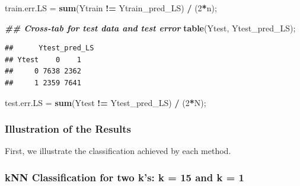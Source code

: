 \documentclass[
]{book}
\newenvironment{Shaded}{\begin{snugshade}}{\end{snugshade}}
\newcommand{\DecValTok}[1]{\textcolor[rgb]{0.00,0.00,0.81}{#1}}
\newcommand{\DocumentationTok}[1]{\textcolor[rgb]{0.56,0.35,0.01}{\textbf{\textit{#1}}}}
\newcommand{\FunctionTok}[1]{\textcolor[rgb]{0.13,0.29,0.53}{\textbf{#1}}}
\newcommand{\NormalTok}[1]{#1}
\newcommand{\OtherTok}[1]{\textcolor[rgb]{0.56,0.35,0.01}{#1}}
\newcommand{\SpecialCharTok}[1]{\textcolor[rgb]{0.81,0.36,0.00}{\textbf{#1}}}
\begin{document}
\begin{Shaded}
\begin{Highlighting}[]
\NormalTok{train.err.LS }\OtherTok{=} \FunctionTok{sum}\NormalTok{(Ytrain }\SpecialCharTok{!=}\NormalTok{  Ytrain\_pred\_LS) }\SpecialCharTok{/}\NormalTok{ (}\DecValTok{2}\SpecialCharTok{*}\NormalTok{n);  }

\DocumentationTok{\#\# Cross{-}tab for test data and test error}
\FunctionTok{table}\NormalTok{(Ytest, Ytest\_pred\_LS);     }
\end{Highlighting}
\end{Shaded}

\begin{verbatim}
##      Ytest_pred_LS
## Ytest    0    1
##     0 7638 2362
##     1 2359 7641
\end{verbatim}

\begin{Shaded}
\begin{Highlighting}[]
\NormalTok{test.err.LS }\OtherTok{=} \FunctionTok{sum}\NormalTok{(Ytest }\SpecialCharTok{!=}\NormalTok{  Ytest\_pred\_LS) }\SpecialCharTok{/}\NormalTok{ (}\DecValTok{2}\SpecialCharTok{*}\NormalTok{N);}
\end{Highlighting}
\end{Shaded}

\subsubsection{Illustration of the Results}\label{illustration-of-the-results}

First, we illustrate the classification achieved by each method.

\subsubsection{kNN Classification for two k's: k = 15 and k = 1}\label{knn-classification-for-two-ks-k-15-and-k-1}
\end{document}
